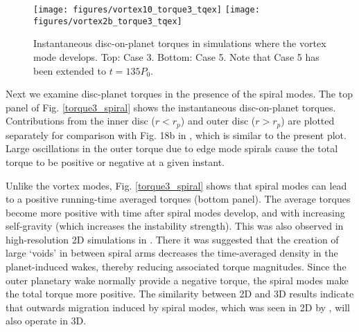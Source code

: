  
\begin{figure}
  \centering
  \texttt{[image: figures/vortex10\_torque3\_tqex]}  
  \texttt{[image: figures/vortex2b\_torque3\_tqex]} 
  \caption{Instantaneous disc-on-planet torques in simulations where the vortex mode develops. 
    Top: Case 3. Bottom: Case 5. Note that Case 5 has been extended to $t=135P_0$. \label{torque3}}
\end{figure}

Next we examine disc-planet torques in the presence of the spiral
modes. The top panel of Fig. \ref{torque3_spiral} shows the
instantaneous disc-on-planet torques. Contributions from the
inner disc ($r < r_p$) and outer disc ($r > r_p$) are plotted
separately for comparison with Fig. 18b in \cite{lin11b}, which is 
similar to the present plot. Large oscillations in the outer torque
due to edge mode spirals cause the total torque to be positive or
negative at a given instant. 

Unlike the vortex modes, Fig. \ref{torque3_spiral} shows that spiral
modes can lead to a positive running-time averaged torques (bottom panel). 
The average torques become more positive with time after spiral modes develop, 
and with increasing self-gravity (which increases the instability strength). 
This was also observed in high-resolution 2D simulations in
\cite{lin11b}. There it was suggested that the creation of large   
`voids' in between spiral arms decreases the time-averaged density in  
the planet-induced wakes, thereby reducing associated torque
magnitudes. Since the outer planetary wake normally provide a negative
torque, the spiral modes make the total torque more positive. 
The similarity between 2D and 3D results indicate that
outwards migration induced by spiral modes, which was seen in 2D by
\cite{lin11b,lin12b}, will also operate in 3D.      



